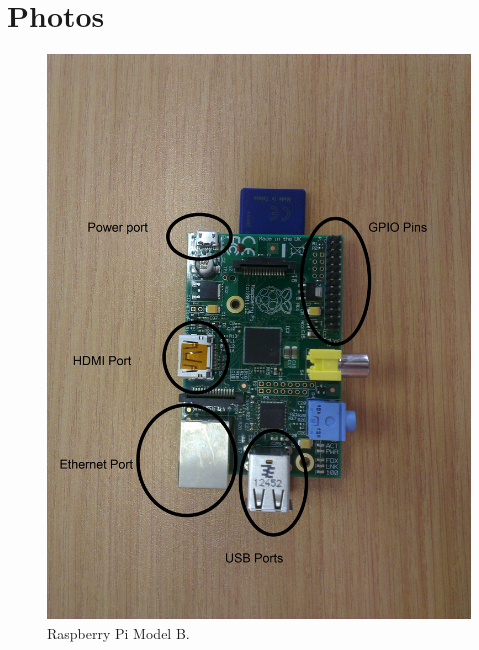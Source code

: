 \chapter{Photos}
\label{app:i}

\begin{figure}
 \centering 
 \includegraphics[clip=true, trim = 0 200 0 400,
 scale=0.13]{pi_pic}
 \caption{Raspberry Pi Model B.}
 \label{fig:pi}
\end{figure}

